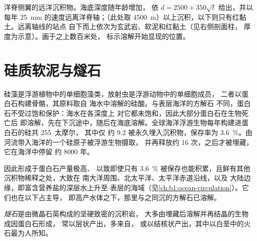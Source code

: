 \begin{omfigure}
{\small 洋脊侧翼的远洋沉积物。海底深度随年龄增加，
依 $d = 2500 + 350\sqrt t$ 给出，并以
每年 \qty{25}{mm} 的速度远离洋脊轴；（此处取
\qty{4500}{m}）以上沉积，以下则只有红黏土。远离轴线的站点
自下而上依次为玄武岩、软泥和红黏土（见右侧剖面柱，
厚度为示意）。画于之上数百米处，
标示溶解开始显现的位置。}
\label{fig:b1:chemical-biogenic-sediments:flank}
\end{omfigure}

\section{硅质软泥与燧石}\label{sec:b1:chemical-biogenic-sediments:silica}

硅藻是浮游植物中的单细胞藻类，放射虫是浮游动物中的单细胞成员，
二者以蛋白石构建骨骼，其原料取自
海水中溶解的硅酸。与表层海洋的方解石
不同，蛋白石不受过饱和保护：海水在各深度上
对它都未饱和，因此大部分蛋白石在生物死亡后
即溶解，先在下沉途中，随后在海底溶解。全球海洋浮游生物每年构建进蛋白石的硅共 255~太摩尔，
其中仅
约 9.2 被永久埋入沉积物，保存率为
\qty{3.6}{\%}。由河流带入海洋的一个硅原子被浮游生物摄取，
并再释放约 16 次，之后才被埋藏，它在海洋中停留
约 \num{8000} 年。

因此形成于蛋白石产量极高、
以致即使只有 \qty{3.6}{\%} 被保存也能积累，且鲜有其他沉积物稀释之处，大致在
南大洋周围、北太平洋、太平洋赤道沿线，以及
大陆边缘，即富含营养盐的深层水上升至
表层的海域（见\cref{ch:b1:ocean-circulation}）。它们也在以下占主导，
即高产水体之下，那里与之同沉的方解石已溶解。

\begin{definition}[燧石]\label{def:b1:chemical-biogenic-sediments:chert}
\emph{燧石}是由微晶石英构成的坚硬致密的沉积岩，
大多由埋藏后溶解并再结晶的生物成因蛋白石形成，
常以层状产出，多来自，
或以结核状产出，其中以白垩中的火石最为人所知。
\end{definition}

